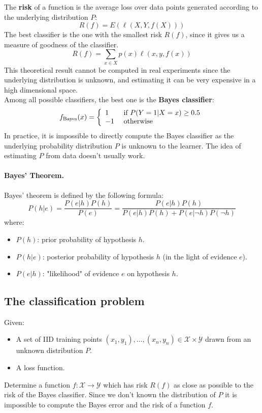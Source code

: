 The \textbf{risk} of a function is the average loss over data points generated according to the underlying distribution $P$:
$$R ( f ) = E ( \ell ( X , Y , f ( X ) ) )$$
The best classifier is the one with the smallest risk $R(f)$, since it gives us a measure of goodness of the classifier.
$$R(f) = \sum_{x \in X}p(x)\ell(x,y,f(x))$$
This theoretical result cannot be computed in real experiments since the underlying distribution is unknown, and estimating it can be very expensive in a high dimensional space.\\
Among all possible classifiers, the best one is the \textbf{Bayes classifier}:
$$
f _ { \text {Bayes} } ( x ) = \left\{ \begin{array} { l l } { 1 } & { \text { if } P ( Y = 1 | X = x ) \geq 0.5 } \\ { - 1 } & { \text { otherwise } } \end{array} \right.
$$
In practice, it is impossible to directly compute the Bayes classifier as the underlying probability distribution $P$ is unknown to the learner. The idea of estimating $P$ from data doesn't usually work.

\paragraph{Bayes' Theorem.} Bayes' theorem is defined by the following formula:
$$
P ( h | e ) = \frac { P ( e | h ) P ( h ) } { P ( e ) } = \frac { P ( e | h ) P ( h ) } { P ( e | h ) P ( h ) + P ( e | \neg h ) P ( \neg h ) }
$$
where:
\begin{itemize}
	\item $P(h)$: prior probability of hypothesis $h$.
	\item $P(h|e)$: posterior probability of hypothesis $h$ (in the light of evidence $e$).
	\item $P(e|h)$: "likelihood" of evidence $e$ on hypothesis $h$.
\end{itemize}

\subsection{The classification problem} 
Given:
\begin{itemize}
	\item A set of IID training points $(x_1,y_1), \dots, (x_n, y_n) \in \mathcal{X} \times \mathcal{Y}$ drawn from an unknown distribution $P$.
	\item A loss function.
\end{itemize}
Determine a function $f:\mathcal{X} \rightarrow \mathcal{Y}$ which has risk $R(f)$ as close as possible to the risk of the Bayes classifier. Since we don't known the distribution of $P$ it is impossible to compute the Bayes error and the risk of a function $f$.

